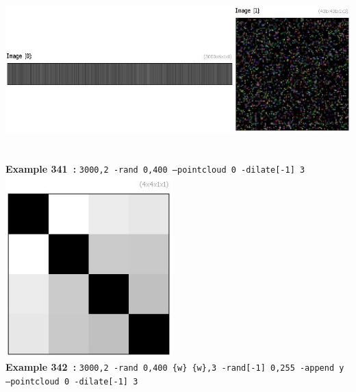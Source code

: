 \documentclass[a4paper,11pt,twoside]{book}
\begin{document}
\begin{center}\includegraphics[keepaspectratio=true,height=7cm,width=\textwidth]{img/gmic_def341.jpg}\\
{\footnotesize \textbf{Example 341~:} \texttt{3000,2 -rand 0,400 --pointcloud 0 -dilate[-1] 3}}
\\\includegraphics[keepaspectratio=true,height=7cm,width=\textwidth]{img/gmic_def342.jpg}\\
{\footnotesize \textbf{Example 342~:} \texttt{3000,2 -rand 0,400 \{w\} \{w\},3 -rand[-1] 0,255 -append y --pointcloud 0 -dilate[-1] 3}}
\end{center}
\end{document}
